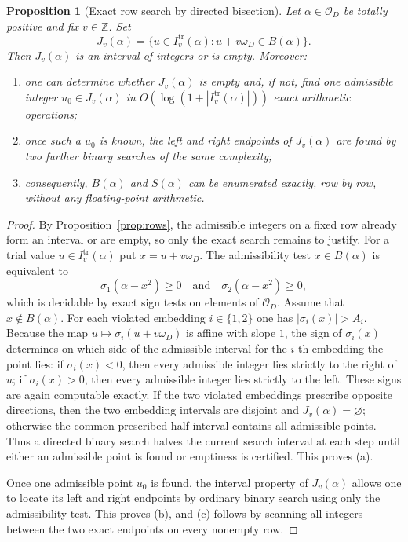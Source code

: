 \documentclass[manuscript,screen]{acmart}
\renewcommand{\ge}{\geqslant}
\theoremstyle{plain}
\newtheorem{proposition}[theorem]{Proposition}
\theoremstyle{definition}
\theoremstyle{nonitalicremark}
\newcommand{\Z}{\mathbb{Z}}
\newcommand{\OD}{\mathcal{O}_D}
\newcommand{\wD}{\omega_D}
\newcommand{\sig}{\sigma}
\begin{document}
\begin{proposition}[Exact row search by directed bisection]\label{prop:exactrow}
Let $\alpha\in\OD$ be totally positive and fix $v\in\Z$.
Set
\[
J_v(\alpha)=\{u\in I_v^{\mathrm{tr}}(\alpha): u+v\wD\in B(\alpha)\}.
\]
Then $J_v(\alpha)$ is an interval of integers or is empty. Moreover:
\begin{enumerate}[label=\textup{(\alph*)},itemsep=0.25em]
\item one can determine whether $J_v(\alpha)$ is empty and, if not, find one admissible
integer $u_0\in J_v(\alpha)$ in $O(\log(1+|I_v^{\mathrm{tr}}(\alpha)|))$ exact arithmetic operations;
\item once such a $u_0$ is known, the left and right endpoints of $J_v(\alpha)$ are found by
two further binary searches of the same complexity;
\item consequently, $B(\alpha)$ and $S(\alpha)$ can be enumerated exactly, row by row, without
any floating-point arithmetic.
\end{enumerate}
\end{proposition}

\begin{proof}
By Proposition~\ref{prop:rows}, the admissible integers on a fixed row already form an interval or
are empty, so only the exact search remains to justify.
For a trial value $u\in I_v^{\mathrm{tr}}(\alpha)$ put $x=u+v\wD$.
The admissibility test $x\in B(\alpha)$ is equivalent to
\[
\sig_1(\alpha-x^2)\ge 0 \quad\text{and}\quad \sig_2(\alpha-x^2)\ge 0,
\]
which is decidable by exact sign tests on elements of $\OD$.
Assume that $x\notin B(\alpha)$. For each violated embedding $i\in\{1,2\}$ one has
$|\sig_i(x)|>A_i$. Because the map $u\mapsto \sig_i(u+v\wD)$ is affine with slope $1$, the sign of
$\sig_i(x)$ determines on which side of the admissible interval for the $i$-th embedding the point
lies: if $\sig_i(x)<0$, then every admissible integer lies strictly to the right of $u$; if
$\sig_i(x)>0$, then every admissible integer lies strictly to the left. These signs are again
computable exactly. If the two violated embeddings prescribe opposite directions, then the two
embedding intervals are disjoint and $J_v(\alpha)=\varnothing$; otherwise the common prescribed
half-interval contains all admissible points. Thus a directed binary search halves the current
search interval at each step until either an admissible point is found or emptiness is certified.
This proves \textup{(a)}.

Once one admissible point $u_0$ is found, the interval property of $J_v(\alpha)$ allows one to
locate its left and right endpoints by ordinary binary search using only the admissibility test.
This proves \textup{(b)}, and \textup{(c)} follows by scanning all integers between the two exact
endpoints on every nonempty row.
\end{proof}
\end{document}
